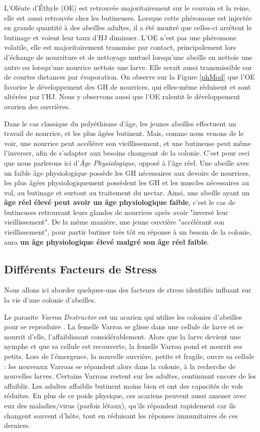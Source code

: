 			 L'Oléate d'Éthyle (OE) est retrouvée majoritairement sur le couvain et la reine, elle est aussi retrouvée chez les butineuses. Lorsque cette phéromone est injectée en grande quantité à des abeilles adultes, il a été montré que celles-ci arrêtent le butinage et voient leur taux d'HJ diminuer. L'OE n'est pas une phéromone volatile, elle est majoritairement transmise par contact, principalement lors d'échange de nourriture et de nettoyage mutuel lorsqu'une abeille en nettoie une autre ou lorsqu'une nourrice nettoie une larve. Elle serait aussi transmissible sur de courtes distances par évaporation. On observe sur la Figure \ref{phMod} que l'OE favorise le développement des GH de nourrices, qui elles-même réduisent et sont altérées par l'HJ. Nous y observons aussi que l'OE ralentit le développement ovarien des ouvrières.
			 
			 Dans le cas classique du polyéthisme d'âge, les jeunes abeilles effectuent un travail de nourrice, et les plus âgées butinent. Mais, comme nous venons de le voir, une nourrice peut accélérer son vieillissement, et une butineuse peut même l'inverser, afin de s'adapter aux besoins changeant de la colonie. C'est pour ceci que nous parlerons ici d'\textit{Âge Physiologique}, opposé à l'âge réel. Une abeille avec un faible âge physiologique possède les GH nécessaires aux devoirs de nourrices, les plus âgées physiologiquement possèdent les GH et les muscles nécessaires au vol, au butinage et surtout au traitement du nectar. Ainsi, une abeille ayant un \textbf{âge réel élevé peut avoir un âge physiologique faible}, c'est le cas de butineuses retrouvant leurs glandes de nourrices après avoir "inversé leur vieillissement". De la même manière, une jeune ouvrière "accélérant son vieillissement", pour partir butiner très tôt en réponse à un besoin de la colonie, aura \textbf{un âge physiologique élevé malgré son âge réel faible}.
			
		\subsection{Différents Facteurs de Stress}
		Nous allons ici aborder quelques-uns des facteurs de stress identifiés influant sur la vie d'une colonie d'abeilles.
		
		Le parasite \textit{Varroa Destructor} est un acarien qui utilise les colonies d'abeilles pour se reproduire \cite{le_conte_varroa_2010}. La femelle Varroa se glisse dans une cellule de larve et se nourrit d'elle, l'affaiblissant considérablement. Alors que la larve devient une nymphe et que sa cellule est recouverte, la femelle Varroa pond et nourrit ses petits. Lors de l'émergence, la nouvelle ouvrière, petite et fragile, ouvre sa cellule : les nouveaux Varroas se répandent alors dans la colonie, à la recherche de nouvelles larves. Certains Varroas restent sur les adultes, continuant encore de les affaiblir. Les adultes affaiblis butinent moins bien et ont des capacités de vols réduites. En plus de ce poids physique, ces acariens peuvent aussi amener avec eux des maladies/virus (parfois létaux), qu'ils répandent rapidement car ils changent souvent d'hôte, tout en réduisant les réponses immunitaires de ces derniers.
		
